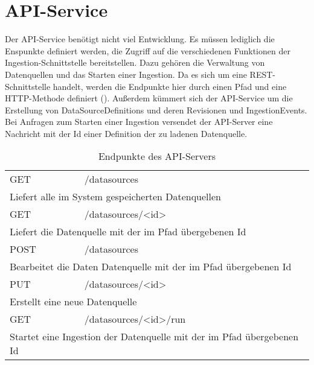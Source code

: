 \section{API-Service}

Der API-Service benötigt nicht viel Entwicklung.
Es müssen lediglich die Enspunkte definiert werden, die Zugriff auf die verschiedenen Funktionen der Ingestion-Schnittstelle bereitstellen.
Dazu gehören die Verwaltung von Datenquellen und das Starten einer Ingestion.
Da es sich um eine REST-Schnittstelle handelt, werden die Endpunkte hier durch einen Pfad und eine HTTP-Methode definiert ().
Außerdem kümmert sich der API-Service um die Erstellung von DataSourceDefinitions und deren Revisionen und IngestionEvents.
Bei Anfragen zum Starten einer Ingestion versendet der API-Server eine Nachricht mit der Id einer Definition der zu ladenen Datenquelle.

    {\renewcommand{\arraystretch}{1.8}
        \begin{table}[ht]
            \centering
            \begin{tabularx}{\linewidth}{|lX|}
                \hline
                GET  & /datasources                                                                         \\
                \multicolumn{2}{|l|}{Liefert alle im System gespeicherten Datenquellen}                     \\
                \hline
                GET  & /datasources/\textless id\textgreater                                                \\
                \multicolumn{2}{|l|}{Liefert die Datenquelle mit der im Pfad übergebenen Id}                \\
                \hline
                POST & /datasources                                                                         \\
                \multicolumn{2}{|l|}{Bearbeitet die Daten Datenquelle mit der im Pfad übergebenen Id}       \\
                \hline
                PUT  & /datasources/\textless id\textgreater                                                \\
                \multicolumn{2}{|l|}{Erstellt eine neue Datenquelle}                                        \\
                \hline
                GET  & /datasources/\textless id\textgreater/run                                            \\
                \multicolumn{2}{|l|}{Startet eine Ingestion der Datenquelle mit der im Pfad übergebenen Id} \\
                \hline
            \end{tabularx}
            \caption{Endpunkte des API-Servers}
            \label{tab:endpunkte}
        \end{table}
    }
